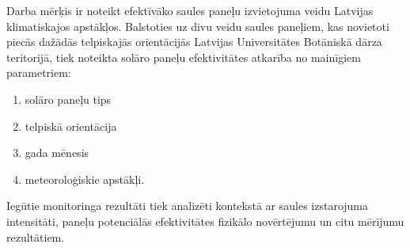 Darba mērķis ir noteikt efektīvāko saules paneļu izvietojuma veidu Latvijas klimatiskajos apstākļos. 
Balstoties uz divu veidu saules paneļiem, kas novietoti piecās dažādās telpiskajās orientācijās Latvijas Universitātes Botāniskā dārza teritorijā, tiek noteikta solāro paneļu efektivitātes atkarība no mainīgiem parametriem:
\begin{enumerate}
\item solāro paneļu tips
\item telpiskā orientācija
\item gada mēnesis
\item meteoroloģiskie apstākļi.
\end{enumerate}

Iegūtie monitoringa rezultāti tiek analizēti kontekstā ar saules izstarojuma intensitāti, paneļu potenciālās efektivitātes fizikālo novērtējumu un citu mērījumu rezultātiem.\\

